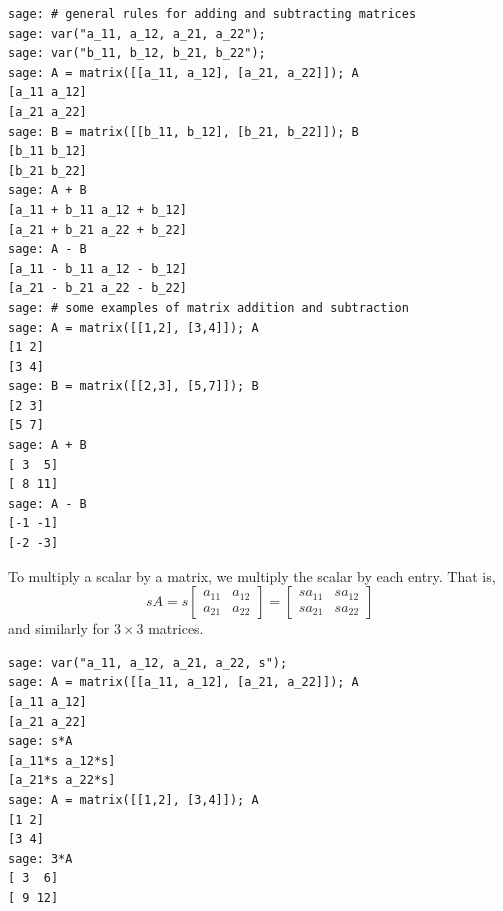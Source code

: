 \begin{lstlisting}
sage: # general rules for adding and subtracting matrices
sage: var("a_11, a_12, a_21, a_22");
sage: var("b_11, b_12, b_21, b_22");
sage: A = matrix([[a_11, a_12], [a_21, a_22]]); A
[a_11 a_12]
[a_21 a_22]
sage: B = matrix([[b_11, b_12], [b_21, b_22]]); B
[b_11 b_12]
[b_21 b_22]
sage: A + B
[a_11 + b_11 a_12 + b_12]
[a_21 + b_21 a_22 + b_22]
sage: A - B
[a_11 - b_11 a_12 - b_12]
[a_21 - b_21 a_22 - b_22]
sage: # some examples of matrix addition and subtraction
sage: A = matrix([[1,2], [3,4]]); A
[1 2]
[3 4]
sage: B = matrix([[2,3], [5,7]]); B
[2 3]
[5 7]
sage: A + B
[ 3  5]
[ 8 11]
sage: A - B
[-1 -1]
[-2 -3]
\end{lstlisting}

To multiply a scalar by a matrix, we multiply the scalar by each
entry. That is,
\[
sA
=
s
\begin{bmatrix}
a_{11} & a_{12} \\
a_{21} & a_{22}
\end{bmatrix}
=
\begin{bmatrix}
sa_{11} & sa_{12} \\
sa_{21} & sa_{22}
\end{bmatrix}
\]
and similarly for $3 \times 3$ matrices.

\begin{lstlisting}
sage: var("a_11, a_12, a_21, a_22, s");
sage: A = matrix([[a_11, a_12], [a_21, a_22]]); A
[a_11 a_12]
[a_21 a_22]
sage: s*A
[a_11*s a_12*s]
[a_21*s a_22*s]
sage: A = matrix([[1,2], [3,4]]); A
[1 2]
[3 4]
sage: 3*A
[ 3  6]
[ 9 12]
\end{lstlisting}

